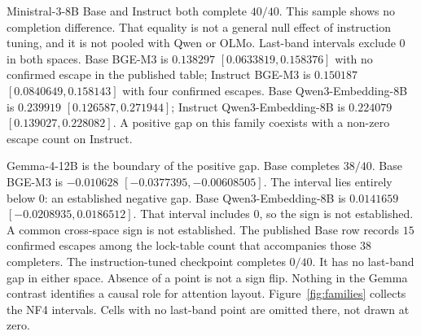 \documentclass[10pt]{article}
\begin{document}
Ministral-3-8B Base and Instruct both complete $40/40$. %
This sample shows no completion difference.
That equality is not a general null effect of instruction tuning, and
it is not pooled with Qwen or OLMo.
Last-band intervals exclude $0$ in both spaces.
Base BGE-M3 is $0.138297$ $[0.0633819, 0.158376]$ with no confirmed
escape in the published table; %
Instruct BGE-M3 is $0.150187$ $[0.0840649, 0.158143]$ with four
confirmed escapes. %
Base Qwen3-Embedding-8B is $0.239919$ $[0.126587, 0.271944]$; %
Instruct Qwen3-Embedding-8B is $0.224079$ $[0.139027, 0.228082]$. %
A positive gap on this family coexists with a non-zero escape count on
Instruct.

Gemma-4-12B is the boundary of the positive gap.
Base completes $38/40$. %
Base BGE-M3 is $-0.010628$ $[-0.0377395, -0.00608505]$. %
The interval lies entirely below $0$: an established negative gap.
Base Qwen3-Embedding-8B is $0.0141659$ $[-0.0208935, 0.0186512]$. %
That interval includes $0$, so the sign is not established.
A common cross-space sign is not established.
The published Base row records $15$ confirmed escapes among the
lock-table count that accompanies those $38$ completers. %
The instruction-tuned checkpoint completes $0/40$. %
It has no last-band gap in either space.
Absence of a point is not a sign flip.
Nothing in the Gemma contrast identifies a causal role for attention
layout.
Figure~\ref{fig:families} collects the NF4 intervals.
Cells with no last-band point are omitted there, not drawn at zero.
\end{document}
